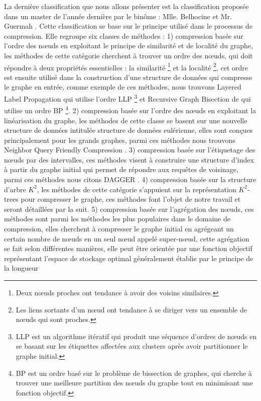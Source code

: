La dernière classification que nous allons présenter est la classification proposée dans un master de l'année dernière par le binôme : Mlle. Belhocine et Mr. Guermah \citep{master2017}. Cette classification se base sur le principe utilisé dans le processus de compression. Elle regroupe six classes de méthodes : 1) compression basée sur l'ordre des nœuds en exploitant le principe de similarité et de localité du graphe, les méthodes de cette catégorie cherchent à trouver un ordre des nœuds, qui doit répondre à deux propriétés essentielles : la similarité \footnote{ Deux nœuds proches ont tendance à avoir des voisins similaires.} et la localité \footnote{ Les liens sortants d'un nœud ont tendance à se diriger vers un ensemble
de nœuds qui sont proches.}, cet ordre est ensuite utilisé dans la construction d'une structure de données qui compresse le graphe en entrée, comme exemple de ces méthodes, nous trouvons Layered Label Propagation \citep{boldi2011layered} qui utilise l'ordre LLP \footnote{LLP est un algorithme itératif qui produit une séquence d’ordres de nœuds en se basant sur les étiquettes affectées aux clusters après avoir partitionner le graphe initial.} et Recursive Graph Bisection de \citep{dhulipala2016compressing} qui utilise un ordre BP \footnote{BP est un ordre basé sur le problème de bissection de graphes, qui cherche à trouver une meilleure partition des nœuds du graphe tout en minimisant une fonction objectif.}. 2) compression basée sur l'ordre des nœuds en exploitant la linéarisation du graphe, les méthodes de cette classe se basent sur une nouvelle structure de données intitulée structure de données eulérienne, elles sont conçues principalement pour les grands graphes, parmi ces méthodes nous trouvons Neighbor Query Friendly Compression 
\citep{maserrat2012community}. 3) compression basée sur l'étiquetage des nœuds par des intervalles, ces méthodes visent à construire une structure d'index à partir du graphe initial qui permet de répondre aux requêtes de voisinage, parmi ces méthodes nous citons DAGGER \citep{yildirim2012grail}. 4) compression basée sur la structure d'arbre ${K}^{2}$, les méthodes de cette catégorie s'appuient sur la représentation ${K}^{2}$-trees pour compresser le graphe, ces méthodes font l'objet de notre travail et seront détaillées par la suit. 5) compression basée sur l'agrégation des nœuds, ces méthodes sont parmi les méthodes les plus populaires dans le domaine de compression, elles cherchent à compresser le graphe initial en agrégeant un certain nombre de nœuds en un seul nœud appelé super-nœud, cette agrégation se fait selon différentes manières, elle peut être orientée par une fonction objectif représentant l’espace de stockage optimal généralement établie par le principe de la longueur
